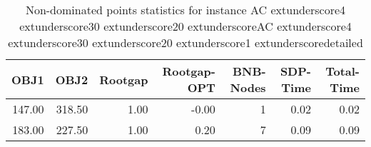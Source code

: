 \begin{table}
\caption{Non-dominated points statistics for instance AC	extunderscore4	extunderscore30	extunderscore20	extunderscoreAC	extunderscore4	extunderscore30	extunderscore20	extunderscore1	extunderscoredetailed}
\label{tab:stats/AC_4_30_20_AC_4_30_20_1_detailed}
\begin{tabular}{rrrrrrr}
\toprule
OBJ1 & OBJ2 & Rootgap & Rootgap-OPT & BNB-Nodes & SDP-Time & Total-Time \\
\midrule
147.00 & 318.50 & 1.00 & -0.00 & 1 & 0.02 & 0.02 \\
183.00 & 227.50 & 1.00 & 0.20 & 7 & 0.09 & 0.09 \\
\bottomrule
\end{tabular}
\end{table}
